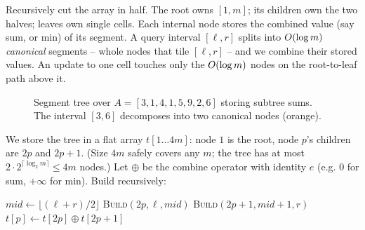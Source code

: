 \begin{intuitionbox}
Recursively cut the array in half. The root owns $[1,m]$; its children own the two halves;
leaves own single cells. Each internal node stores the combined value (say sum, or min) of
its segment. A query interval $[\ell,r]$ splits into $O(\log m)$ \emph{canonical}
segments -- whole nodes that tile $[\ell,r]$ -- and we combine their stored values. An update
to one cell touches only the $O(\log m)$ nodes on the root-to-leaf path above it.
\end{intuitionbox}

\begin{figure}[H]
\centering
{}
\caption{Segment tree over $A=[3,1,4,1,5,9,2,6]$ storing subtree sums. The interval $[3,6]$
decomposes into two canonical nodes (orange).}
\label{ch23:fig-segtree}
\end{figure}

We store the tree in a flat array $t[1\ldots 4m]$: node $1$ is the root, node $p$'s children
are $2p$ and $2p{+}1$. (Size $4m$ safely covers any $m$; the tree has at most $2\cdot
2^{\lceil\log_2 m\rceil}\le 4m$ nodes.) Let $\oplus$ be the combine operator with identity
$e$ (e.g. $0$ for sum, $+\infty$ for min). Build recursively:

\begin{algorithm}[H]
\DontPrintSemicolon
\caption{\textsc{Build}$(p,\ell,r)$ -- node $p$ owns $[\ell,r]$}
$\textit{mid} \gets \lfloor(\ell+r)/2\rfloor$\;
\textsc{Build}$(2p,\ell,\textit{mid})$\; \textsc{Build}$(2p{+}1,\textit{mid}{+}1,r)$\;
$t[p] \gets t[2p] \oplus t[2p{+}1]$\;
\end{algorithm}

